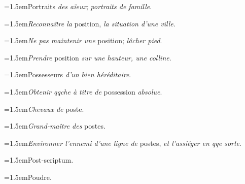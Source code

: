 \par{\dictfontsize\hangindent=1.5em\noindent Portraits \textit{des aïeux}; \textit{portraits de famille}. \par}
\par{\dictfontsize\hangindent=1.5em\noindent \textit{Reconnaître la} position, \textit{la situation d’une ville}. \par}
\par{\dictfontsize\hangindent=1.5em\noindent \textit{Ne pas maintenir une} position; \textit{lâcher pied}. \par}
\par{\dictfontsize\hangindent=1.5em\noindent \textit{Prendre} position \textit{sur une hauteur, une colline}. \par}
\par{\dictfontsize\hangindent=1.5em\noindent Possesseurs \textit{d’un bien héréditaire}. \par}
\par{\dictfontsize\hangindent=1.5em\noindent \textit{Obtenir qqche à titre de} possession \textit{absolue}. \par}
\par{\dictfontsize\hangindent=1.5em\noindent \textit{Chevaux de} poste. \par}
\par{\dictfontsize\hangindent=1.5em\noindent \textit{Grand-maître des} postes. \par}
\par{\dictfontsize\hangindent=1.5em\noindent \textit{Environner l’ennemi d’une ligne de} postes, \textit{et l’assiéger en qqe sorte}. \par}
\par{\dictfontsize\hangindent=1.5em\noindent Post-scriptum. \par}
\par{\dictfontsize\hangindent=1.5em\noindent Poudre. \par}
